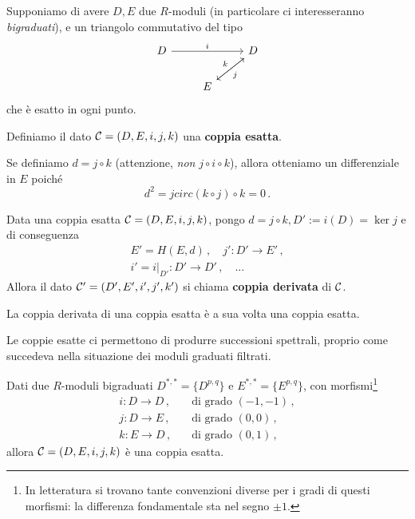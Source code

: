 Supponiamo di avere $D,E$ due $R$-moduli (in particolare ci interesseranno \emph{bigraduati}),
e un triangolo commutativo del tipo
\begin{equation*}
	\begin{tikzcd}
		D \ar[rr, "i"] & & D \ar[dl, "j"] \\
		& E \ar[ur, "k"] &
	\end{tikzcd}
\end{equation*}
che è esatto in ogni punto.

\begin{df}
	Definiamo il dato $\mathcal{C} = (D,E,i,j,k)$ una \textbf{coppia esatta}.
\end{df}

\begin{oss}
	Se definiamo $d= j \circ k$ (attenzione, \emph{non} $j \circ i \circ k$),
	allora otteniamo un differenziale in $E$ poiché
	\begin{equation*}
		d^{2} = j circ (k \circ j) \circ k = 0\,.
	\end{equation*}
\end{oss}

\begin{df}
	Data una coppia esatta $\mathcal{C} = (D,E,i,j,k)$, pongo
	$d = j \circ k, D':= i(D) = \ker j$ e di conseguenza
	\begin{align*}
		E' = H(E,d)\,, \quad j' : D' \to E'\,, \\
		i' = i\vert_{D'} : D' \to D'\,, \quad ...
	\end{align*}
	Allora il dato $\mathcal{C}' = (D',E',i',j',k')$
	si chiama \textbf{coppia derivata} di $\mathcal{C}$.
\end{df}

\begin{prop}
	La coppia derivata di una coppia esatta è a sua volta
	una coppia esatta.
\end{prop}

Le coppie esatte ci permettono di produrre
successioni spettrali, proprio
come succedeva nella situazione dei moduli graduati filtrati.

\begin{thm}
	Dati due $R$-moduli bigraduati $D^{*,*}=\{D^{p,q}\}$ e $E^{*,*}=\{E^{p,q}\}$,
	con morfismi\footnote{In letteratura si trovano tante convenzioni diverse per i gradi di questi morfismi: la differenza fondamentale sta nel segno $\pm 1$.}
	\begin{align*}
		i : D \longrightarrow D\,, \quad &\text{di grado } (-1,-1)\,, \\
		j : D \longrightarrow E\,, \quad &\text{di grado } (0,0)\,, \\
		k : E \longrightarrow D\,, \quad &\text{di grado } (0,1)\,,
	\end{align*}
	allora $\mathcal{C} = (D,E,i,j,k)$ è una coppia esatta.
\end{thm}

